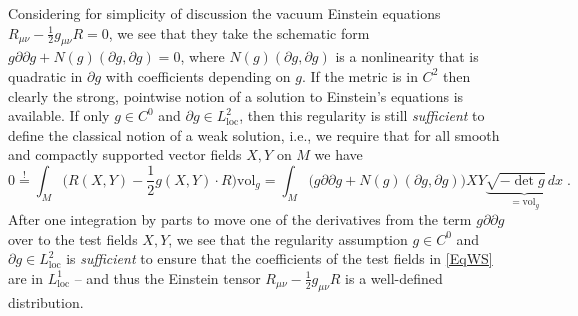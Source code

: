 \documentclass[reqno]{article}
\newcommand{\vol}{\mathrm{vol}}
\newcommand{\loc}{\mathrm{loc}}
\newcommand{\rd}{\partial}
\begin{document}
Considering for simplicity of discussion the vacuum Einstein equations $R_{\mu \nu} - \frac{1}{2} g_{\mu \nu} R = 0$, we see that they take the schematic form $g \rd \rd g + N(g)(\rd g, \rd g) = 0$, where $N(g)(\rd g, \rd g)$ is a nonlinearity that is quadratic in $\rd g$ with coefficients depending on $g$. If the metric is in $C^2$ then clearly the strong, pointwise notion of a solution to Einstein's equations is available. If only $g \in C^0$ and $\rd g\in L^2_{\loc}$, then this regularity is still \emph{sufficient} to define the classical notion of a weak solution, i.e., we require that for all smooth and compactly supported vector fields $X, Y$ on $M$ we have 
\begin{equation}\label{EqWS}
0\overset{!}{=} \int_M \big(R(X,Y) - \frac{1}{2}g(X,Y) \cdot R\big) \vol_g = \int_M \big( g \rd \rd g + N(g)(\rd g, \rd g)\big) X Y \underbrace{\sqrt{-\det g} \, dx}_{= \vol_g} \;.
\end{equation} 
After one integration by parts to move one of the derivatives from the term $g \rd \rd g$ over to the test fields $X,Y$, we see that the regularity assumption $g \in C^0$ and $\partial g \in L^2_{\loc}$ is \emph{sufficient} to ensure that the coefficients of the test fields in \eqref{EqWS} are in $L^1_{\loc}$ -- and thus the Einstein tensor $R_{\mu \nu} - \frac{1}{2} g_{\mu \nu} R$ is a well-defined distribution. 
\end{document}
